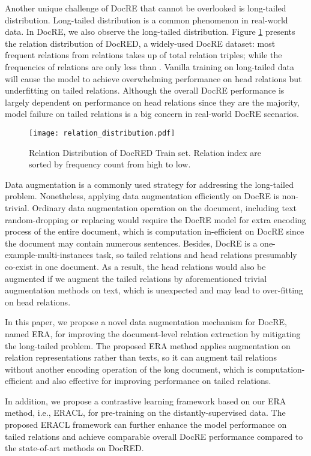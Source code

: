 \documentclass[11pt]{article}
\begin{document}
Another unique challenge of DocRE that cannot be overlooked is long-tailed distribution. Long-tailed distribution is a common phenomenon in real-world data. In DocRE, we also observe the long-tailed distribution. Figure \ref{fig:docred-long-tail-distribution} presents the relation distribution of DocRED\citep{yao-etal-2019-docred}, a widely-used DocRE dataset:  most frequent relations from  relations takes up  of total relation triples; while the frequencies of  relations are only less than . Vanilla training on long-tailed data will cause the model to achieve overwhelming performance on head relations but underfitting on tailed relations. Although the overall DocRE performance is largely dependent on performance on head relations since they are the majority, model failure on tailed relations is a big concern in real-world DocRE scenarios. 
\begin{figure}[h]
    \centering
    \texttt{[image: relation\_distribution.pdf]}
    \caption{Relation Distribution of DocRED Train set. Relation index are sorted by frequency count from high to low.}
    \label{fig:docred-long-tail-distribution}
\end{figure}

Data augmentation is a commonly used strategy for addressing the long-tailed problem. Nonetheless, applying data augmentation efficiently on DocRE is non-trivial. Ordinary data augmentation operation on the document, including text random-dropping or replacing\citep{wei-zou-2019-eda} would require the DocRE model for extra encoding process of the entire document, which is computation in-efficient on DocRE since the document may contain numerous sentences. Besides, DocRE is a one-example-multi-instances task, so tailed relations and head relations presumably co-exist in one document. As a result, the head relations would also be augmented if we augment the tailed relations by aforementioned trivial augmentation methods on text, which is unexpected and may lead to over-fitting on head relations.

In this paper, we propose a novel data augmentation mechanism for DocRE, named ERA, for improving the document-level relation extraction by mitigating the long-tailed problem. The proposed ERA method applies augmentation on relation representations rather than texts, so it can augment tail relations without another encoding operation of the long document, which is computation-efficient and also effective for improving performance on tailed relations.

In addition, we propose a contrastive learning framework based on our ERA method, i.e., ERACL, for pre-training on the distantly-supervised data. The proposed ERACL framework can further enhance the model performance on tailed relations and achieve comparable overall DocRE performance compared to the state-of-art methods on DocRED.
\end{document}
